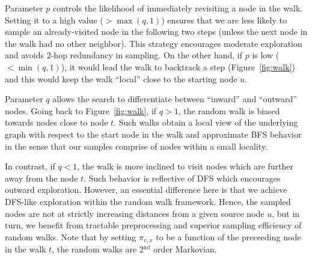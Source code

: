  Parameter $p$ controls the likelihood of immediately revisiting a node in the walk. Setting it to a high value ($>\max(q, 1)$) ensures that we are less likely to sample an already-visited node in the following two steps (unless the next node in the walk had no other neighbor). This strategy encourages moderate exploration and avoids $2$-hop redundancy in sampling. On the other hand, if $p$ is low ($<\min(q, 1)$), it would lead the walk to backtrack a step (Figure~\ref{fig:walk}) and this would keep the walk ``local'' close to the starting node $u$.


 Parameter $q$ allows the search to differentiate between ``inward'' and ``outward'' nodes.  Going back to Figure~\ref{fig:walk}, if $q>1$, the random walk is biased towards nodes close to node $t$. Such walks obtain a local view of the underlying graph with respect to the start node in the walk and approximate BFS behavior in the sense that our samples comprise of nodes within a small locality.  

In contrast, if $q<1$, the walk is more inclined to visit nodes which are further away from the node $t$. Such behavior is reflective of DFS which encourages outward exploration. However, an essential difference here is that we achieve DFS-like exploration within the random walk framework. Hence, the sampled nodes are not at strictly increasing distances from a given source node $u$, but in turn, we benefit from tractable preprocessing and superior sampling efficiency of random walks. Note that by setting $\pi_{v,x}$ to be a function of the preceeding node in the walk $t$, the random walks are 2$^{\textrm{nd}}$ order Markovian.


